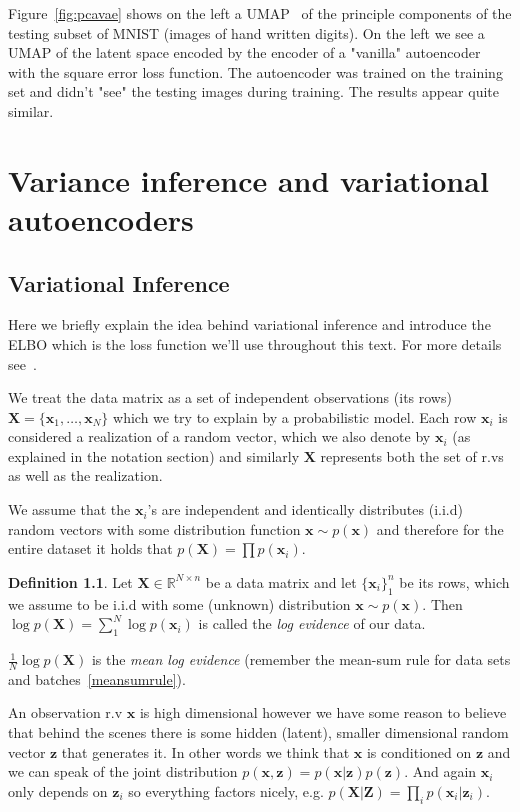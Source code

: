 \documentclass[11pt, a4paper]{report}
\theoremstyle{plain}
\theoremstyle{definition}
\newtheorem{mydef}{Definition}[chapter]
\theoremstyle{remark}
\newcommand{\R}{\mathbb{R}}
\newcommand{\X}{\mathbf{X}}
\newcommand{\x}{\mathbf{x}}
\newcommand{\Z}{\mathbf{Z}}
\newcommand{\z}{\mathbf{z}}
\newcommand{\bv}[1]{\boldsymbol{#1}}
\begin{document}
Figure~\ref{fig:pcavae} shows on the left a
UMAP~\cite{mcinnes2018umap} of the principle components of the testing subset of
MNIST (images of hand written digits). On the left we see a UMAP of the latent
space encoded by the encoder of a "vanilla" autoencoder with the square error loss
function. The autoencoder was
trained on the training set and didn't "see" the testing images during training.
The results appear quite similar.

\chapter{Variance inference and variational autoencoders}
\section{Variational Inference}

Here we briefly explain the idea behind variational inference and introduce the
ELBO which is the loss function we'll use throughout this text.
For more details see~.

We treat the data matrix as a set of independent observations (its rows)
$\bv{X} = \{\bv{x}_1, \dots
, \bv{x}_N\}$ which we try to explain by a probabilistic model. 
Each row $\x_i$ is considered a realization of a random vector, which we also 
denote by $\x_i$ (as explained in the notation section) and similarly $\X$
represents both the set of r.vs as well as the realization.

We assume that
the $\bv{x}_i$'s are independent and identically distributes (i.i.d) random vectors
with some distribution function $\x \sim p(\x)$ and therefore for
the entire dataset it holds that $p(\bv{X}) = \prod p(\bv{x}_i)$.

\begin{mydef}
\label{def:logevidence}
Let $\bv{X} \in \R^{N \times n}$ be a data matrix and let $\{\bv{x}_i\}_1^n$ be its
rows,
which we assume to be i.i.d with some (unknown) distribution $\x \sim p(\bv{x})$.
Then $\log p(\bv{X}) = \sum_1^N \log p(\bv{x}_i)$ is called the \emph{log evidence} of our
data.

$\frac{1}{N}\log p(\X)$ is the \emph{mean log evidence} (remember the
mean-sum rule for data sets and
batches~\ref{meansumrule}).
\end{mydef}

An observation r.v $\bv{x}$ is high dimensional however
we have some reason to believe that behind the scenes there is some hidden
(latent), smaller dimensional random vector $\z$ that generates it.
In other words we think that $\x$ is conditioned on $\z$ and we can speak of
the joint distribution $p(\x,\z) = p(\x | \z)p(\z)$.
And again $\x_i$ only depends on $\z_i$ so everything factors nicely, e.g. 
$p(\X | \Z) = \prod_i p(\x_i | \z_i)$.
\end{document}
